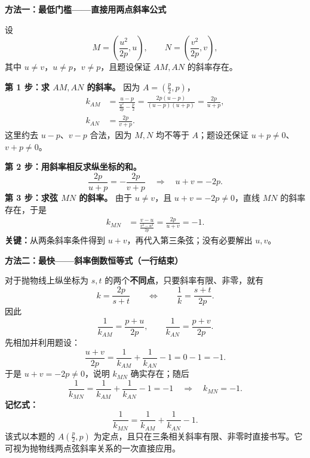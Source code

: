 \clearpage
\begin{proofbox}
\textbf{方法一：最低门槛——直接用两点斜率公式}
\begin{center}\end{center}


设
\[
 M=\left(\frac{u^2}{2p},u\right),\qquad
 N=\left(\frac{v^2}{2p},v\right),
\]
其中 $u\neq v$，$u\neq p$，$v\neq p$，且题设保证 $AM,AN$ 的斜率存在。

\textbf{第 1 步：求 $AM,AN$ 的斜率。} 因为 $A=(\frac p2,p)$，
\[
\begin{aligned}
 k_{AM}&=\frac{u-p}{\frac{u^2}{2p}-\frac p2}
 =\frac{2p(u-p)}{(u-p)(u+p)}=\frac{2p}{u+p},\\[3pt]
 k_{AN}&=\frac{2p}{v+p}.
\end{aligned}
\]
这里约去 $u-p$、$v-p$ 合法，因为 $M,N$ 均不等于 $A$；题设还保证 $u+p\ne0$、$v+p\ne0$。

\textbf{第 2 步：用斜率相反求纵坐标的和。}
\[
 \frac{2p}{u+p}=-\frac{2p}{v+p}
 \quad\Longrightarrow\quad \boxed{u+v=-2p}.
\]
\textbf{第 3 步：求弦 $MN$ 的斜率。} 由于 $u\ne v$，且 $u+v=-2p\ne0$，直线 $MN$ 的斜率存在，于是
\[
\begin{aligned}
 k_{MN}&=\frac{v-u}{\frac{v^2-u^2}{2p}}
 =\frac{2p}{u+v}
 =\boxed{-1}.
\end{aligned}
\]
\textbf{关键：}从两条斜率条件得到 $u+v$，再代入第三条弦；没有必要解出 $u,v$。
\end{proofbox}

\clearpage
\begin{proofbox}
\textbf{方法二：最快——斜率倒数恒等式（一行结束）}
\begin{center}\end{center}


对于抛物线上纵坐标为 $s,t$ 的两个\textbf{不同点}，只要斜率有限、非零，就有
\[
 k=\frac{2p}{s+t}\qquad\Longleftrightarrow\qquad
 \frac1k=\frac{s+t}{2p}.
\]
因此
\[
 \frac1{k_{AM}}=\frac{p+u}{2p},\qquad
 \frac1{k_{AN}}=\frac{p+v}{2p}.
\]
先相加并利用题设：
\[
 \frac{u+v}{2p}=
 \frac1{k_{AM}}+\frac1{k_{AN}}-1=0-1=-1.
\]
于是 $u+v=-2p\ne0$，说明 $k_{MN}$ 确实存在；随后
\[
 \boxed{\frac1{k_{MN}}=
 \frac1{k_{AM}}+\frac1{k_{AN}}-1=-1}
 \quad\Longrightarrow\quad\boxed{k_{MN}=-1}.
\]
\textbf{记忆式：}
\[
 \boxed{\frac1{k_{MN}}=\frac1{k_{AM}}+\frac1{k_{AN}}-1}.
\]
该式以本题的 $A(\frac p2,p)$ 为定点，且只在三条相关斜率有限、非零时直接书写。它可视为抛物线两点弦斜率关系的一次直接应用。
\end{proofbox}


